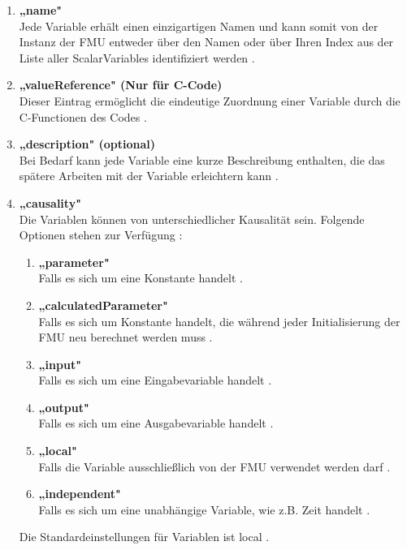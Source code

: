 \begin{enumerate}
	\item \textbf{„name"} \cite[S.46]{25} \\
	Jede Variable erhält einen einzigartigen Namen und kann somit von der Instanz der FMU
	entweder über den Namen oder über Ihren Index aus der Liste aller ScalarVariables
	identifiziert werden \cite[S.46]{25}.
	\item \textbf{„valueReference" (Nur für C-Code)} \cite[S.46f]{25} \\
	Dieser Eintrag ermöglicht die eindeutige Zuordnung einer Variable durch die C-Functionen
	des Codes \cite[S.46f]{25}.
	\item \textbf{„description" (optional)} \cite[S.47]{25} \\
	Bei Bedarf kann jede Variable eine kurze Beschreibung enthalten, die das spätere Arbeiten
	mit der Variable erleichtern kann \cite[S.47]{25}.
	\item \textbf{„causality"} \cite[S.47]{25} \\
	Die Variablen können von unterschiedlicher Kausalität sein. Folgende Optionen stehen zur
	Verfügung \cite[S.47]{25}:
	\begin{enumerate}
		\item \textbf{„parameter"} \cite[S.47]{25} \\
		Falls es sich um eine Konstante handelt \cite[S.47]{25}.
		\item \textbf{„calculatedParameter"} \cite[S.47]{25} \\
		Falls es sich um Konstante handelt, die während jeder 
		Initialisierung der FMU neu berechnet werden muss \cite[S.47]{25}.
		\item \textbf{„input"} \cite[S.47]{25} \\
		Falls es sich um eine Eingabevariable handelt \cite[S.47]{25}.
		\item \textbf{„output"} \cite[S.47]{25} \\
		Falls es sich um eine Ausgabevariable handelt \cite[S.47]{25}.
		\item \textbf{„local"} \cite[S.47]{25} \\
		Falls die Variable ausschließlich von der FMU verwendet werden darf \cite[S.47]{25}.
		\item \textbf{„independent"} \cite[S.47]{25} \\
		Falls es sich um eine unabhängige Variable, wie z.B. Zeit handelt \cite[S.47]{25}.
	\end{enumerate}
	Die Standardeinstellungen für Variablen ist local \cite[S.47]{25}.

\end{enumerate}
